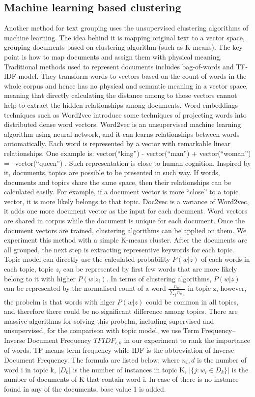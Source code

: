 \subsection{Machine learning based clustering}
\label{sec:Document vector}
Another method for text grouping uses the unsupervised clustering algorithms of machine learning. The idea behind it is mapping original text to a vector space, grouping documents based on clustering algorithm (such as K-means). The key point is how to map documents and assign them with physical meaning. Traditional methods used to represent documents includes bag-of-words and TF-IDF model. They transform words to vectors based on the count of words in the whole corpus and hence has no physical and semantic meaning in a vector space, meaning that directly calculating the distance among to those vectors cannot help to extract the hidden relationships among documents. Word embeddings techniques such as Word2vec \cite{mikolov2013distributed,mikolov2013efficient} introduce some techniques of projecting words into distributed dense word vectors. Word2vec is an unsupervised machine learning algorithm using neural network, and it can learns relationships between words automatically. Each word is represented by a vector with remarkable linear relationships. One example is: vector(“king”) - vector(“man”) + vector(“woman”) =~ vector(“queen”) \cite{journals/corr/cs-CL-0205028}. Such representation is close to human cognition. Inspired by it, documents, topics are possible to be presented in such way. If words, documents and topics share the same space, then their relationships can be calculated easily. For example, if a document vector is more ``close'' to a topic vector, it is more likely belongs to that topic. Doc2vec \cite{le2014distributed} is a variance of Word2vec, it adds one more document vector as the input for each document. Word vectors are shared in corpus while the document is unique for each document. Once the document vectors are trained, clustering algorithms can be applied on them. We experiment this method with a simple K-means cluster. 
After the documents are all grouped, the next step is extracting representive keywords for each topic. Topic model can directly use the calculated probability $P(w|z)$ of each words in each topic, topic $z_i$ can be represented by first few words that are more likely belong to it with higher $P(w|z_i)$. In terms of clustering algorithms, $P(w|z)$ can be represented by the normalised count of a word $\frac{n_w}{\sum_jn_{w_{jz}}}$ in topic z, however, the probelm is that words with higer $P(w|z)$ could be common in all topics, and therefore there could be no significant difference among topics. There are massive algorithms for solving this probelm, including supervised and unsupervised, for the comparison with topic model, we use Term Frequency–Inverse Document Frequency $TFIDF_{i,k}$ in our experiment to rank the importance of words. TF means term frequency while IDF is the abbreviation of Inverse Document Frequency. The formula are listed below, where $n_i,d$ is the number of word i in topic k, $|D_k|$ is the number of instances in topic K, $|{\{j: w_i \in D_k\}}|$ is the number of documents of K that contain word i. In case of there is no instance found in any of the documents, base value 1 is added.
